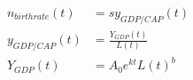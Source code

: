 \documentclass[preview]{standalone}
\begin{document}
\begin{equation*}
\begin{split}
n_{birthrate}(t) &= sy_{GDP/CAP}(t)  \\
y_{GDP/CAP}(t) &= \frac{Y_{GDP}(t)}{L(t)} \\
Y_{GDP}(t) &= A_{0}e^{kt}L(t)^b \\
\end{split}
\end{equation*}
\end{document}
